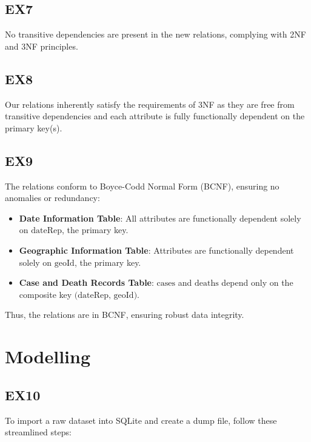 \documentclass{article}
\begin{document}
\subsection{EX7}
No transitive dependencies are present in the new relations, complying with 2NF and 3NF principles.

\subsection{EX8}
Our relations inherently satisfy the requirements of 3NF as they are free from transitive dependencies and each attribute is fully functionally dependent on the primary key(s).

\subsection{EX9}
The relations conform to Boyce-Codd Normal Form (BCNF), ensuring no anomalies or redundancy:
\begin{itemize}
    \item \textbf{Date Information Table}: All attributes are functionally dependent solely on \( \text{dateRep} \), the primary key.
    \item \textbf{Geographic Information Table}: Attributes are functionally dependent solely on \( \text{geoId} \), the primary key.
    \item \textbf{Case and Death Records Table}: \( \text{cases} \) and \( \text{deaths} \) depend only on the composite key \( \text{(dateRep, geoId)} \).
\end{itemize}
Thus, the relations are in BCNF, ensuring robust data integrity.
\section{Modelling}
\subsection{EX10}

To import a raw dataset into SQLite and create a dump file, follow these streamlined steps:
\end{document}
